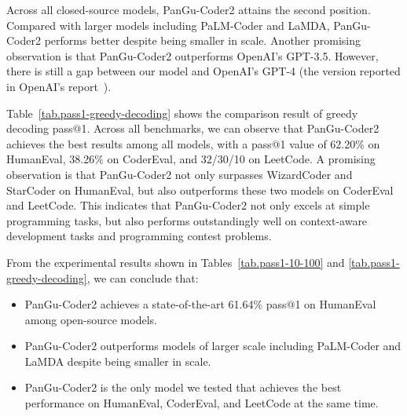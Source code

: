 \documentclass{article}
\newcommand{\pgcoder}{PanGu-Coder2\xspace}
\begin{document}
Across all closed-source models, \pgcoder attains the second position. Compared with larger models including PaLM-Coder and LaMDA, \pgcoder performs better despite being smaller in scale. Another promising observation is that \pgcoder outperforms OpenAI's GPT-3.5. However, there is still a gap between our model and OpenAI's GPT-4 (the version reported in OpenAI's report~\cite{gpt4-report}).

Table~\ref{tab.pass1-greedy-decoding} shows the comparison result of greedy decoding pass@1. Across all benchmarks, we can observe that \pgcoder achieves the best results among all models, with a pass@1 value of 62.20\% on HumanEval, 38.26\% on CoderEval, and 32/30/10 on LeetCode. A promising observation is that \pgcoder not only surpasses WizardCoder and StarCoder on HumanEval, but also outperforms these two models on CoderEval and LeetCode. This indicates that \pgcoder not only excels at simple programming tasks, but also performs outstandingly well on context-aware development tasks and programming contest problems. 

From the experimental results shown in Tables~\ref{tab.pass1-10-100} and \ref{tab.pass1-greedy-decoding}, we can conclude that:
\begin{itemize}
    \item \pgcoder achieves a state-of-the-art 61.64\% pass@1 on HumanEval among open-source models.
    \item \pgcoder outperforms models of larger scale including PaLM-Coder and LaMDA despite being smaller in scale.
    \item \pgcoder is the only model we tested that achieves the best performance on HumanEval, CoderEval, and LeetCode at the same time.
\end{itemize}
\end{document}
